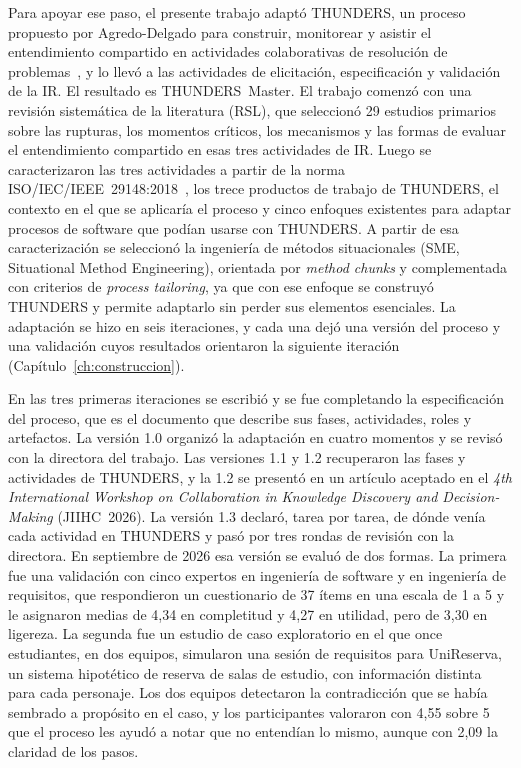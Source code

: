 \documentclass[12pt,letterpaper,oneside]{report}
\begin{document}
Para apoyar ese paso, el presente trabajo adaptó THUNDERS, un proceso propuesto
por Agredo-Delgado para construir, monitorear y asistir el entendimiento
compartido en actividades colaborativas de resolución de
problemas~\cite{agredo2022thesis}, y lo llevó a las actividades de elicitación,
especificación y validación de la IR. El resultado es THUNDERS~Master. El
trabajo comenzó con una revisión sistemática de la literatura (RSL), que
seleccionó 29 estudios primarios sobre las rupturas, los momentos críticos, los
mecanismos y las formas de evaluar el entendimiento compartido en esas tres
actividades de IR. Luego se caracterizaron las tres actividades a partir de la
norma ISO/IEC/IEEE~29148:2018~\cite{iso29148}, los trece productos de trabajo de
THUNDERS, el contexto en el que se aplicaría el proceso y cinco enfoques
existentes para adaptar procesos de software que podían usarse con THUNDERS. A
partir de esa caracterización se seleccionó la ingeniería de métodos
situacionales (SME, Situational Method Engineering), orientada por
\textit{method chunks} y complementada con criterios de \textit{process
tailoring}, ya que con ese enfoque se construyó THUNDERS y permite adaptarlo sin
perder sus elementos esenciales. La adaptación se hizo en seis iteraciones, y
cada una dejó una versión del proceso y una validación cuyos resultados
orientaron la siguiente iteración (Capítulo~\ref{ch:construccion}).

En las tres primeras iteraciones se escribió y se fue completando la
especificación del proceso, que es el documento que describe sus fases,
actividades, roles y artefactos. La versión 1.0 organizó la adaptación en cuatro
momentos y se revisó con la directora del trabajo. Las versiones 1.1 y 1.2
recuperaron las fases y actividades de THUNDERS, y la 1.2 se presentó en un
artículo aceptado en el \textit{4th International Workshop on Collaboration in
Knowledge Discovery and Decision-Making} (JIIHC~2026). La versión 1.3 declaró,
tarea por tarea, de dónde venía cada actividad en THUNDERS y pasó por tres
rondas de revisión con la directora. En septiembre de 2026 esa versión se evaluó
de dos formas. La primera fue una validación con cinco expertos en ingeniería de
software y en ingeniería de requisitos, que respondieron un cuestionario de 37
ítems en una escala de 1 a 5 y le asignaron medias de 4,34 en completitud y 4,27
en utilidad, pero de 3,30 en ligereza. La segunda fue un estudio de caso
exploratorio en el que once estudiantes, en dos equipos, simularon una sesión de
requisitos para UniReserva, un sistema hipotético de reserva de salas de
estudio, con información distinta para cada personaje. Los dos equipos
detectaron la contradicción que se había sembrado a propósito en el caso, y los
participantes valoraron con 4,55 sobre 5 que el proceso les ayudó a notar que no
entendían lo mismo, aunque con 2,09 la claridad de los pasos.
\end{document}
